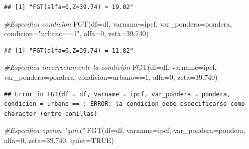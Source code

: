 \documentclass[
]{book}
\newenvironment{Shaded}{\begin{snugshade}}{\end{snugshade}}
\newcommand{\AttributeTok}[1]{\textcolor[rgb]{0.77,0.63,0.00}{#1}}
\newcommand{\CommentTok}[1]{\textcolor[rgb]{0.56,0.35,0.01}{\textit{#1}}}
\newcommand{\ConstantTok}[1]{\textcolor[rgb]{0.00,0.00,0.00}{#1}}
\newcommand{\DecValTok}[1]{\textcolor[rgb]{0.00,0.00,0.81}{#1}}
\newcommand{\FloatTok}[1]{\textcolor[rgb]{0.00,0.00,0.81}{#1}}
\newcommand{\FunctionTok}[1]{\textcolor[rgb]{0.00,0.00,0.00}{#1}}
\newcommand{\NormalTok}[1]{#1}
\newcommand{\SpecialCharTok}[1]{\textcolor[rgb]{0.00,0.00,0.00}{#1}}
\newcommand{\StringTok}[1]{\textcolor[rgb]{0.31,0.60,0.02}{#1}}
\begin{document}
\begin{verbatim}
## [1] "FGT(alfa=0,Z=39.74) = 19.02"
\end{verbatim}

\begin{Shaded}
\begin{Highlighting}[]
\CommentTok{\#Especifica condicion}
\FunctionTok{FGT}\NormalTok{(}\AttributeTok{df=}\NormalTok{df, }\AttributeTok{varname=}\NormalTok{ipcf, }\AttributeTok{var\_pondera=}\NormalTok{pondera, }\AttributeTok{condicion=}\StringTok{"urbano==1"}\NormalTok{, }\AttributeTok{alfa=}\DecValTok{0}\NormalTok{, }\AttributeTok{zeta=}\FloatTok{39.740}\NormalTok{)}
\end{Highlighting}
\end{Shaded}

\begin{verbatim}
## [1] "FGT(alfa=0,Z=39.74) = 11.82"
\end{verbatim}

\begin{Shaded}
\begin{Highlighting}[]
\CommentTok{\#Especifica incorrectamente la condición}
\FunctionTok{FGT}\NormalTok{(}\AttributeTok{df=}\NormalTok{df, }\AttributeTok{varname=}\NormalTok{ipcf, }\AttributeTok{var\_pondera=}\NormalTok{pondera, }\AttributeTok{condicion=}\NormalTok{urbano}\SpecialCharTok{==}\DecValTok{1}\NormalTok{, }\AttributeTok{alfa=}\DecValTok{0}\NormalTok{, }\AttributeTok{zeta=}\FloatTok{39.740}\NormalTok{)}
\end{Highlighting}
\end{Shaded}

\begin{verbatim}
## Error in FGT(df = df, varname = ipcf, var_pondera = pondera, condicion = urbano == : ERROR: la condicion debe especificarse como character (entre comillas)
\end{verbatim}

\begin{Shaded}
\begin{Highlighting}[]
\CommentTok{\#Especifica opcion "quiet"}
\FunctionTok{FGT}\NormalTok{(}\AttributeTok{df=}\NormalTok{df, }\AttributeTok{varname=}\NormalTok{ipcf, }\AttributeTok{var\_pondera=}\NormalTok{pondera, }\AttributeTok{alfa=}\DecValTok{0}\NormalTok{, }\AttributeTok{zeta=}\FloatTok{39.740}\NormalTok{, }\AttributeTok{quiet=}\ConstantTok{TRUE}\NormalTok{)}
\end{Highlighting}
\end{Shaded}

~
\end{document}
